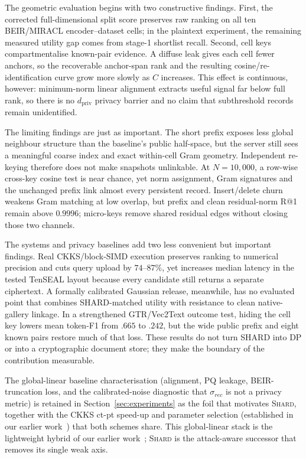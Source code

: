 The geometric evaluation begins with two constructive findings. First, the
corrected full-dimensional split score preserves raw
ranking on all ten BEIR/MIRACL encoder--dataset cells; in the plaintext
experiment, the remaining measured utility gap comes from stage-1 shortlist
recall. Second, cell keys compartmentalise
known-pair evidence. A diffuse leak gives each cell fewer anchors, so the
recoverable anchor-span rank and the resulting cosine/re-identification curve
grow more slowly as $C$ increases. This effect is continuous, however:
minimum-norm linear alignment extracts useful signal far below full rank, so
there is no $d_{\mathrm{priv}}$ privacy barrier and no claim that subthreshold
records remain unidentified.

The limiting findings are just as important. The short prefix exposes less global neighbour structure than the
baseline's public half-space, but the server still sees a meaningful coarse
index and exact within-cell Gram geometry. Independent re-keying therefore
does not make snapshots unlinkable. At $N=10{,}000$, a row-wise cross-key
cosine test is near chance, yet norm assignment, Gram signatures and the
unchanged prefix link almost every persistent record. Insert/delete churn
weakens Gram matching at low overlap, but prefix and clean residual-norm R@1
remain above $0.9996$; micro-keys remove shared residual edges without closing
those two channels.

The systems and privacy baselines add two less convenient but important
findings. Real CKKS/block-SIMD execution preserves ranking to numerical
precision and cuts query upload by $74$--$87\%$, yet increases median latency
in the tested TenSEAL layout because every candidate still returns a separate
ciphertext. A formally calibrated Gaussian release, meanwhile, has no
evaluated point that combines SHARD-matched utility with resistance to clean
native-gallery linkage. In a strengthened GTR/Vec2Text outcome test, hiding
the cell key lowers mean token-F1 from $.665$ to $.242$, but the wide public
prefix and eight known pairs restore much of that loss. These results do not
turn SHARD into DP or into a
cryptographic document store; they make the boundary of the contribution
measurable.

\noindent
The global-linear baseline characterisation (alignment, PQ leakage,
BEIR-truncation loss, and the calibrated-noise diagnostic that
$\sigma_{rec}$ is not a privacy metric) is retained in
Section~\ref{sec:experiments} as the foil that motivates \textsc{Shard},
together with the CKKS ct-pt speed-up and parameter selection
(established in our earlier work~\cite{ref_vkit,ref_alpha}) that both schemes
share. This global-linear stack is the lightweight hybrid of our earlier
work~\cite{ref_vkit}; \textsc{Shard} is the attack-aware successor that
removes its single weak axis.

